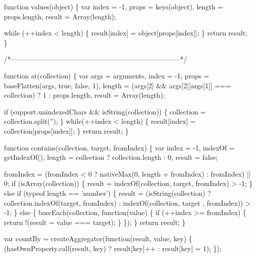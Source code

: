 \begin{DoxyCodeInclude}
    \textcolor{keyword}{function} values(\textcolor{keywordtype}{object}) \{
      var index = -1,
          props = keys(\textcolor{keywordtype}{object}),
          length = props.length,
          result = Array(length);

      \textcolor{keywordflow}{while} (++index < length) \{
        result[index] = \textcolor{keywordtype}{object}[props[index]];
      \}
      \textcolor{keywordflow}{return} result;
    \}

    \textcolor{comment}{/*--------------------------------------------------------------------------*/}

    \textcolor{keyword}{function} at(collection) \{
      var args = arguments,
          index = -1,
          props = baseFlatten(args, \textcolor{keyword}{true}, \textcolor{keyword}{false}, 1),
          length = (args[2] && args[2][args[1]] === collection) ? 1 : props.length,
          result = Array(length);

      \textcolor{keywordflow}{if} (support.unindexedChars && isString(collection)) \{
        collection = collection.split(\textcolor{stringliteral}{''});
      \}
      \textcolor{keywordflow}{while}(++index < length) \{
        result[index] = collection[props[index]];
      \}
      \textcolor{keywordflow}{return} result;
    \}

    \textcolor{keyword}{function} contains(collection, target, fromIndex) \{
      var index = -1,
          indexOf = getIndexOf(),
          length = collection ? collection.length : 0,
          result = \textcolor{keyword}{false};

      fromIndex = (fromIndex < 0 ? nativeMax(0, length + fromIndex) : fromIndex) || 0;
      \textcolor{keywordflow}{if} (isArray(collection)) \{
        result = indexOf(collection, target, fromIndex) > -1;
      \} \textcolor{keywordflow}{else} \textcolor{keywordflow}{if} (typeof length == \textcolor{stringliteral}{'number'}) \{
        result = (isString(collection) ? collection.indexOf(target, fromIndex) : indexOf(collection, target
      , fromIndex)) > -1;
      \} \textcolor{keywordflow}{else} \{
        baseEach(collection, \textcolor{keyword}{function}(value) \{
          \textcolor{keywordflow}{if} (++index >= fromIndex) \{
            \textcolor{keywordflow}{return} !(result = value === target);
          \}
        \});
      \}
      \textcolor{keywordflow}{return} result;
    \}

    var countBy = createAggregator(\textcolor{keyword}{function}(result, value, key) \{
      (hasOwnProperty.call(result, key) ? result[key]++ : result[key] = 1);
    \});


\end{DoxyCodeInclude}
